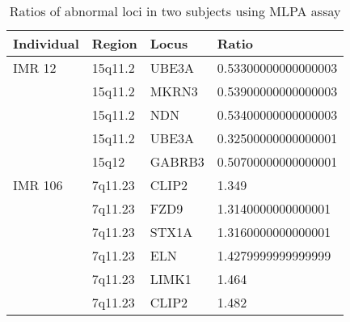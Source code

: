 \begin{table}
\centering
\caption{Ratios of abnormal loci in two subjects using MLPA assay}
\label{tab:my_label}

\begin{tabular}{ | l | l | l | l | }
\hline
	Individual & Region  & Locus  & Ratio               \\ \hline
	IMR 12     & 15q11.2 & UBE3A  & 0.53300000000000003 \\ \hline
             & 15q11.2 & MKRN3  & 0.53900000000000003 \\ \hline
             & 15q11.2 & NDN    & 0.53400000000000003 \\ \hline
             & 15q11.2 & UBE3A  & 0.32500000000000001 \\ \hline
             & 15q12   & GABRB3 & 0.50700000000000001 \\ \hline
	IMR 106    & 7q11.23 & CLIP2  & 1.349               \\ \hline
             & 7q11.23 & FZD9   & 1.3140000000000001  \\ \hline
             & 7q11.23 & STX1A  & 1.3160000000000001  \\ \hline
             & 7q11.23 & ELN    & 1.4279999999999999  \\ \hline
             & 7q11.23 & LIMK1  & 1.464               \\ \hline
             & 7q11.23 & CLIP2  & 1.482               \\ \hline
\end{tabular}
\end{table}

